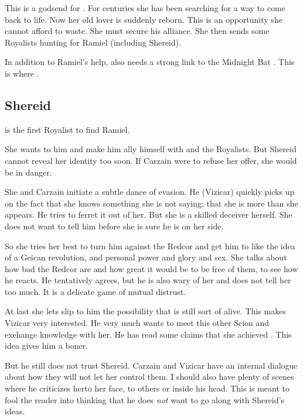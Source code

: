 This is a godsend for \Shiaraid. 
For centuries she has been searching for a way to come back to life. 
Now her old lover is suddenly reborn. 
This is an opportunity she cannot afford to waste. 
She must secure his alliance. 
She then sends some Royalists hunting for Ramiel (including Shereid). 

In addition to Ramiel's help, \Shiaraid{} also needs a strong link to the Midnight Bat \matrix. 
This is where . 





\subsection{Shereid}
 is the first Royalist to find Ramiel. 

She wants to  him and make him ally himself with \Belzir{} and the Royalists.
But Shereid cannot reveal her identity too soon. 
If Carzain were to refuse her offer, she would be in danger. 

She and Carzain initiate a subtle dance of evasion. 
He (Vizicar) quickly picks up on the fact that she knows something she is not saying; that she is more than she appears. 
He tries to ferret it out of her. 
But she is a skilled deceiver herself. 
She does not want to tell him before she is sure he is on her side. 

So she tries her best to turn him against the Redcor and get him to like the idea of a Geican revolution, and personal power and glory and sex. 
She talks about how bad the Redcor are and how great it would be to be free of them, to see how he reacts. 
He tentatively agrees, but he is also wary of her and does not tell her too much. 
It is a delicate game of mutual distrust. 

At last she lets slip to him the possibility that \Belzir{} is still sort of alive. 
This makes Vizicar very interested. 
He very much wants to meet this other Scion and exchange knowledge with her. 
He has read some claims that she achieved \apotheosis. 
This idea gives him a boner. 

But he still does not trust Shereid. 
Carzain and Vizicar have an internal dialogue about how they will not let her control them. 
I should also have plenty of scenes where he criticizes her\dash to her face, to others or inside his head. 
This is meant to fool the reader into thinking that he does \emph{not} want to go along with Shereid's ideas. 

